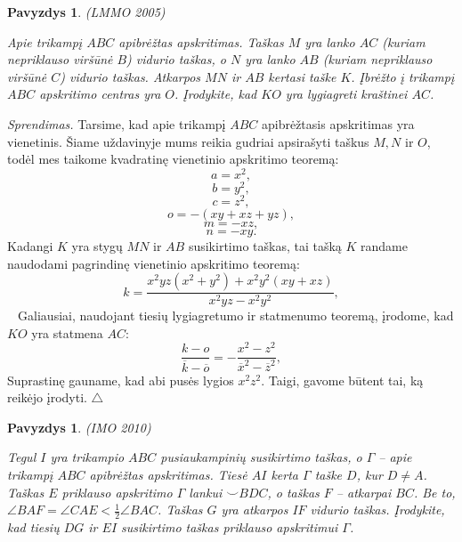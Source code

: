 \documentclass[11pt,a4paper,twoside]{book}
\newenvironment{sprendimas}{\noindent \textit{Sprendimas.}}{\hfill $\triangle$}
\newcounter{foo}[subsection]
\newtheorem{pavnr}[foo]{Pavyzdys}
\theoremstyle{definition} \newtheorem*{api}{Apibrėžimas}
\theoremstyle{remark} \newtheorem*{pastaba}{Pastaba}
\begin{document}
\begin{pavnr}
(LMMO 2005)

Apie trikampį $ABC$ apibrėžtas apskritimas. Taškas $M$ yra lanko $AC$ (kuriam nepriklauso viršūnė $B$) vidurio taškas, o $N$ yra lanko $AB$ (kuriam nepriklauso viršūnė $C$) vidurio taškas. Atkarpos $MN$ ir $AB$ kertasi taške $K$. Įbrėžto į trikampį $ABC$ apskritimo centras yra $O$. Įrodykite, kad $KO$ yra lygiagreti kraštinei $AC$. 
\end{pavnr}
\begin{sprendimas}
Tarsime, kad apie trikampį $ABC$ apibrėžtasis apskritimas yra vienetinis. Šiame uždavinyje mums reikia gudriai apsirašyti taškus $M, N$ ir $O$, todėl mes taikome kvadratinę vienetinio apskritimo teoremą:
$$a = x^2,$$
$$b=y^2,$$
$$c = z^2,$$
$$ o = - (xy+xz+yz),$$
$$m = - xz,$$
$$ n = - xy.$$
Kadangi $K$ yra stygų $MN$ ir $AB$ susikirtimo taškas, tai tašką $K$ randame naudodami pagrindinę vienetinio apskritimo teoremą:
$$k = \frac{ x^2yz(x^2+y^2)+ x^2 y^2 (xy+xz)}{ x^2 yz - x^2 y^2},$$
$\phantom{a}$ 
Galiausiai, naudojant tiesių lygiagretumo ir statmenumo teoremą, įrodome, kad $KO$ yra statmena $AC$:
$$\frac{k-o}{\overline k - \overline o}  = - \frac{ x^2 - z^2}{\overline x^2 - \overline z^2},$$
Suprastinę gauname, kad abi pusės lygios $x^2 z^2$. Taigi, gavome būtent tai, ką reikėjo įrodyti.
\end{sprendimas}







\begin{pavnr}
(IMO 2010)

Tegul $I$ yra trikampio $ABC$ pusiaukampinių susikirtimo taškas, o $\Gamma$ – apie trikampį $ABC$ apibrėžtas apskritimas. Tiesė $AI$ kerta $\Gamma$ taške $D$, kur $D\ne A$. Taškas $E$ priklauso apskritimo $\Gamma$ lankui $\smile BDC$, o taškas $F$ – atkarpai $BC$. Be to, $\angle BAF = \angle CAE < \frac{1}{2}\angle BAC$. Taškas $G$ yra atkarpos $IF$ vidurio taškas. Įrodykite, kad tiesių $DG$ ir $EI$ susikirtimo taškas priklauso apskritimui $\Gamma$.
\end{pavnr}
\end{document}
